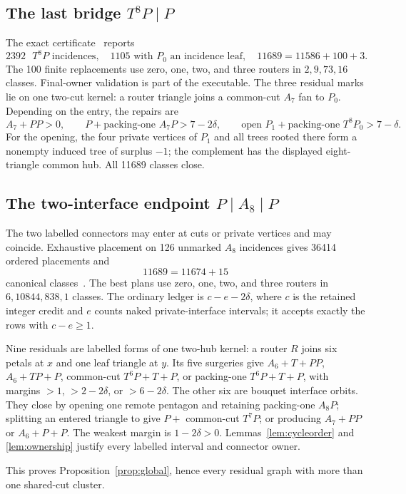 \documentclass[11pt]{article}
\begin{document}
\subsection{The last bridge \texorpdfstring{$T^8P\mid P$}{T8P | P}}

The exact certificate~\cite{T8PLast} reports
\[
 2392\text{ }T^8P\text{ incidences},\quad
 1105\text{ with }P_0\text{ an incidence leaf},\quad
 11689=11586+100+3.
\]
The 100 finite replacements use zero, one, two, and three routers in
$2,9,73,16$ classes.  Final-owner validation is part of the executable.  The
three residual marks lie on one two-cut kernel: a router triangle joins a
common-cut $A_7$ fan to $P_0$.  Depending on the entry, the repairs are
\[
 A_7+PP>0,
 \qquad P+\text{packing-one }A_7P>7-2\delta,
 \qquad \text{open }P_1+\text{packing-one }T^8P_0>7-\delta.
\]
For the opening, the four private vertices of $P_1$ and all trees rooted there
form a nonempty induced tree of surplus $-1$; the complement has the displayed
eight-triangle common hub.  All 11689 classes close.

\subsection{The two-interface endpoint
\texorpdfstring{$P\mid A_8\mid P$}{P | A8 | P}}

The two labelled connectors may enter at cuts or private vertices and may
coincide.  Exhaustive placement on 126 unmarked $A_8$ incidences gives 36414
ordered placements and
\[
 11689=11674+15
\]
canonical classes~\cite{A8Interface}.  The best plans use zero, one, two, and
three routers in $6,10844,838,1$ classes.  The ordinary ledger is
$c-e-2\delta$, where $c$ is the retained integer credit and $e$ counts naked
private-interface intervals; it accepts exactly the rows with $c-e\geq1$.

Nine residuals are labelled forms of one two-hub kernel: a router $R$ joins six
petals at $x$ and one leaf triangle at $y$.  Its five surgeries give
$A_6+T+PP$, $A_6+TP+P$, common-cut $T^6P+T+P$, or packing-one
$T^6P+T+P$, with margins $>1$, $>2-2\delta$, or $>6-2\delta$.
The other six are bouquet interface orbits.  They close by opening one remote
pentagon and retaining packing-one $A_8P$; splitting an entered triangle to
give $P+$ common-cut $T^7P$; or producing $A_7+PP$ or $A_6+P+P$.
The weakest margin is $1-2\delta>0$.  Lemmas~\ref{lem:cycleorder} and
\ref{lem:ownership} justify every labelled interval and connector owner.

This proves Proposition~\ref{prop:global}, hence every residual graph with more
than one shared-cut cluster.
\end{document}
